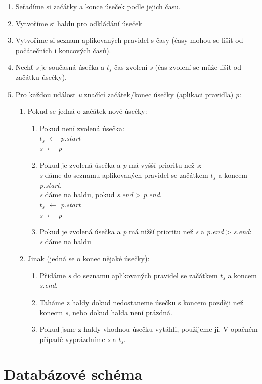 \begin{enumerate}
  \item Seřadíme si začátky a konce úseček podle jejich času.
  \item Vytvoříme si haldu pro odkládání úseček
  \item Vytvoříme si seznam aplikovaných pravidel s časy (časy mohou se lišit od počátečních i koncových časů).
  \item Nechť \textit{s} je současná úsečka a \textit{$t_s$} čas zvolení \textit{s} (čas zvolení se může lišit od začátku úsečky).
  \item Pro každou událost \textit{u} značící začátek/konec úsečky (aplikaci pravidla) \textit{p}:
  \begin{enumerate}
    \item Pokud se jedná o začátek nové úsečky:
    \begin{enumerate}
      \item Pokud není zvolená úsečka:\\
            \textit{$t_s$} $\leftarrow$ \textit{p.start}\\
            \textit{s} $\leftarrow$ \textit{p}
      \item Pokud je zvolená úsečka a \textit{p} má vyšší prioritu než \textit{s}:\\
            \textit{s} dáme do seznamu aplikovaných pravidel se začátkem \textit{$t_s$} a koncem \textit{p.start}.\\
            \textit{s} dáme na haldu, pokud \textit{s.end} > \textit{p.end}.\\
            \textit{$t_s$} $\leftarrow$ \textit{p.start}\\
            \textit{s} $\leftarrow$ \textit{p}
      \item Pokud je zvolená úsečka a \textit{p} má nižší prioritu než \textit{s} a \textit{p.end} > \textit{s.end}:\\
            \textit{s} dáme na haldu
    \end{enumerate}
    \item Jinak (jedná se o konec nějaké úsečky):
    \begin{enumerate}
      \item Přidáme \textit{s} do seznamu aplikovaných pravidel se začátkem \textit{$t_s$} a koncem \textit{s.end}.
      \item Taháme z haldy dokud nedostaneme úsečku s koncem později než konecm \textit{s}, nebo dokud halda není prázdná.
      \item Pokud jsme z haldy vhodnou úsečku vytáhli, použijeme ji. V opačném případě vyprázdníme \textit{s} a \textit{$t_s$}.
    \end{enumerate}
  \end{enumerate}
\end{enumerate}

\section{Databázové schéma} \label{db_schema}
